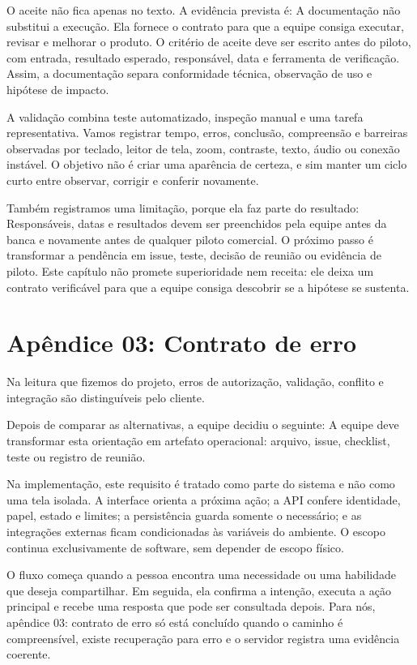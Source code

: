 \documentclass[12pt,oneside,a4paper,article]{abntex2}
\begin{document}
O aceite não fica apenas no texto. A evidência prevista é: A documentação não substitui a execução. Ela fornece o contrato para que a equipe consiga executar, revisar e melhorar o produto. O critério de aceite deve ser escrito antes do piloto, com entrada, resultado esperado, responsável, data e ferramenta de verificação. Assim, a documentação separa conformidade técnica, observação de uso e hipótese de impacto.

A validação combina teste automatizado, inspeção manual e uma tarefa representativa. Vamos registrar tempo, erros, conclusão, compreensão e barreiras observadas por teclado, leitor de tela, zoom, contraste, texto, áudio ou conexão instável. O objetivo não é criar uma aparência de certeza, e sim manter um ciclo curto entre observar, corrigir e conferir novamente.

Também registramos uma limitação, porque ela faz parte do resultado: Responsáveis, datas e resultados devem ser preenchidos pela equipe antes da banca e novamente antes de qualquer piloto comercial. O próximo passo é transformar a pendência em issue, teste, decisão de reunião ou evidência de piloto. Este capítulo não promete superioridade nem receita: ele deixa um contrato verificável para que a equipe consiga descobrir se a hipótese se sustenta.

\section{Apêndice 03: Contrato de erro}
Na leitura que fizemos do projeto, erros de autorização, validação, conflito e integração são distinguíveis pelo cliente.

Depois de comparar as alternativas, a equipe decidiu o seguinte: A equipe deve transformar esta orientação em artefato operacional: arquivo, issue, checklist, teste ou registro de reunião.

Na implementação, este requisito é tratado como parte do sistema e não como uma tela isolada. A interface orienta a próxima ação; a API confere identidade, papel, estado e limites; a persistência guarda somente o necessário; e as integrações externas ficam condicionadas às variáveis do ambiente. O escopo continua exclusivamente de software, sem depender de escopo físico.

O fluxo começa quando a pessoa encontra uma necessidade ou uma habilidade que deseja compartilhar. Em seguida, ela confirma a intenção, executa a ação principal e recebe uma resposta que pode ser consultada depois. Para nós, apêndice 03: contrato de erro só está concluído quando o caminho é compreensível, existe recuperação para erro e o servidor registra uma evidência coerente.
\end{document}
